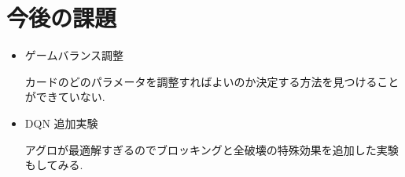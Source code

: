 \documentclass{jarticle}     %
\begin{document}
\section{今後の課題}
\begin{itemize}
  \item ゲームバランス調整
  \par 
  カードのどのパラメータを調整すればよいのか決定する方法を見つけることができていない.
  \item DQN 追加実験
  \par 
  アグロが最適解すぎるのでブロッキングと全破壊の特殊効果を追加した実験もしてみる.
\end{itemize}


\end{document}
